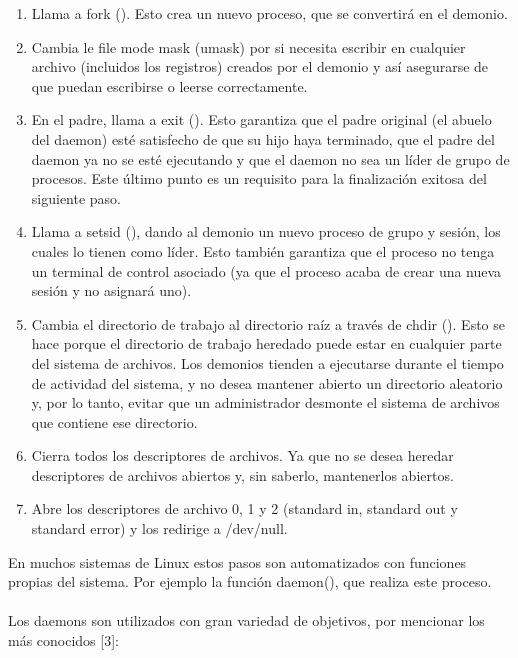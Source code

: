 \documentclass[conference]{IEEEtran}
\begin{document}
\begin{enumerate}
    \item Llama a fork (). Esto crea un nuevo proceso, que se convertirá en el demonio.
    \item Cambia le file mode mask (umask) por si necesita escribir en cualquier archivo (incluidos los registros) creados por el demonio y así asegurarse de que puedan escribirse o leerse correctamente.
    \item En el padre, llama a exit (). Esto garantiza que el padre original (el abuelo del daemon) esté satisfecho de que su hijo haya terminado, que el padre del daemon ya no se esté ejecutando y que el daemon no sea un líder de grupo de procesos. Este último punto es un requisito para la finalización exitosa del siguiente paso.
    \item Llama a setsid (), dando al demonio un nuevo proceso de grupo y sesión, los cuales lo tienen como líder. Esto también garantiza que el proceso no tenga un terminal de control asociado (ya que el proceso acaba de crear una nueva sesión y no asignará uno).
    \item Cambia el directorio de trabajo al directorio raíz a través de chdir (). Esto se hace porque el directorio de trabajo heredado puede estar en cualquier parte del sistema de archivos. Los demonios tienden a ejecutarse durante el tiempo de actividad del sistema, y no desea mantener abierto un directorio aleatorio y, por lo tanto, evitar que un administrador desmonte el sistema de archivos que contiene ese directorio.
    \item Cierra todos los descriptores de archivos. Ya que no se desea heredar descriptores de archivos abiertos y, sin saberlo, mantenerlos abiertos.
    \item Abre los descriptores de archivo 0, 1 y 2 (standard in, standard out y standard error) y los redirige a /dev/null.
\end{enumerate}
En muchos sistemas de Linux estos pasos son automatizados con funciones propias del sistema. Por ejemplo la función daemon(), que realiza este proceso.
\\\\Los daemons son utilizados con gran variedad de objetivos, por mencionar los más conocidos [3]:
\end{document}
